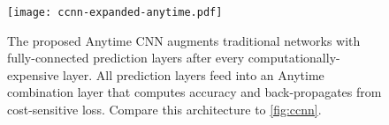 \begin{figure}[h!]
\begin{center}
\texttt{[image: ccnn-expanded-anytime.pdf]}
\caption[Architecture of the proposed Anytime CNN.]{
The proposed Anytime CNN augments traditional networks with fully-connected prediction layers after every computationally-expensive layer.
All prediction layers feed into an Anytime combination layer that computes accuracy and back-propagates from cost-sensitive loss.
Compare this architecture to \autoref{fig:ccnn}.
}\label{fig:ccnn_anytime}
\end{center}
\end{figure}
